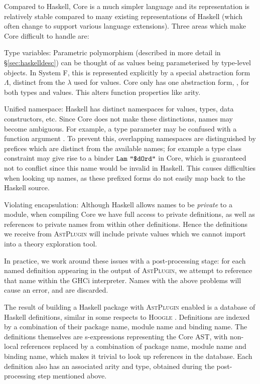 Compared to Haskell, Core is a much simpler language and its representation is relatively stable compared to many existing representations of Haskell (which often change to support various language extensions). Three areas which make Core difficult to handle are:

\begin{description}
  \item{Type variables}: Parametric polymorphism (described in more detail in \S \ref{sec:haskelldesc}) can be thought of as values being parameterised by type-level objects. In System F, this is represented explicitly by a special abstraction form $\Lambda$, distinct from the $\lambda$ used for values. Core only has one abstraction form, \CLam, for both types and values. This alters function properties like arity.

  \item{Unified namespace}: Haskell has distinct namespaces for values, types, data constructors, etc. Since Core does not make these distinctions, names may become ambiguous. For example, a type parameter  may be confused with a function argument . To prevent this, overlapping namespaces are distinguished by prefices which are distinct from the available names; for example a type class constraint  may give rise to a binder $\texttt{Lam}\ \texttt{"\$dOrd"}$ in Core, which is guaranteed not to conflict since this name would be invalid in Haskell. This causes difficulties when looking up names, as these prefixed forms do not easily map back to the Haskell source.

  \item{Violating encapsulation}: Although Haskell allows names to be \emph{private} to a module, when compiling Core we have full access to private definitions, as well as references to private names from within other definitions. Hence the definitions we receive from \textsc{AstPlugin} will include private values which we cannot import into a theory exploration tool.
\end{description}

In practice, we work around these issues with a post-processing stage: for each named definition appearing in the output of \textsc{AstPlugin}, we attempt to reference that name within the GHCi interpreter. Names with the above problems will cause an error, and are discarded.

The result of building a Haskell package with \textsc{AstPlugin} enabled is a database of Haskell definitions, similar in some respects to \textsc{Hoogle} \citep{mitchell2008hoogle}. Definitions are indexed by a combination of their package name, module name and binding name. The definitions themselves are s-expressions representing the Core AST, with non-local references replaced by a combination of package name, module name and binding name, which makes it trivial to look up references in the database. Each definition also has an associated arity and type, obtained during the post-processing step mentioned above.

